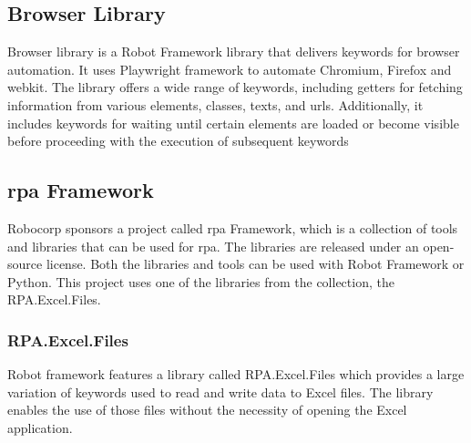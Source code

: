 \subsection{Browser Library}
Browser library is a Robot Framework library that delivers keywords for browser automation.
It uses Playwright framework to automate Chromium, Firefox and webkit.
The library offers a wide range of keywords, including getters for fetching information from various elements, classes, texts, and \gls{url}s.
Additionally, it includes keywords for waiting until certain elements are loaded or become visible before proceeding with the execution of subsequent keywords
\cite{robotFramework:browserLibrary}

\subsection{\gls{rpa} Framework}
Robocorp sponsors a  project called \gls{rpa} Framework, which is a collection of tools and libraries that can be used for \gls{rpa}.
The libraries are released under an open-source license.
Both the libraries and tools can be used with Robot Framework or Python.
This project uses one of the libraries from the collection, the RPA.Excel.Files.
\subsubsection{RPA.Excel.Files}
Robot framework features a library called RPA.Excel.Files which provides a large variation of keywords used to read and write data to Excel files.
The library enables the use of those files without the necessity of opening the Excel application.
\cite{rpaFramework:excelFiles}

\clearpage %
